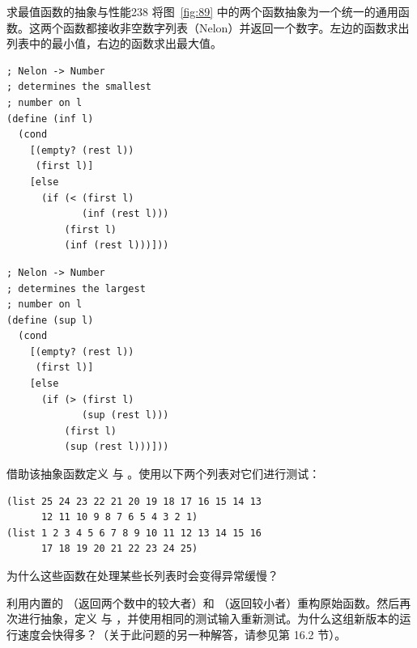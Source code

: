 \begin{exercise}{求最值函数的抽象与性能}{238}
将图~\ref{fig:89} 中的两个函数抽象为一个统一的通用函数。这两个函数都接收非空数字列表（Nelon）并返回一个数字。左边的函数求出列表中的最小值，右边的函数求出最大值。

\begin{center}
  \begin{stepperbox}[unbreakable]
    \noindent\begin{minipage}[t]{0.48\linewidth}\vspace{0pt}
\begin{Verbatim}[commandchars=\\\{\}, fontsize=\fontsize{6.0pt}{7.2pt}\selectfont]
; Nelon -> Number
; determines the smallest
; number on l
(define (inf l)
  (cond
    [(empty? (rest l))
     (first l)]
    [else
      (if (< (first l)
             (inf (rest l)))
          (first l)
          (inf (rest l)))]))
\end{Verbatim}
    \end{minipage}\hfill
    \begin{minipage}[t]{0.48\linewidth}\vspace{0pt}
\begin{Verbatim}[commandchars=\\\{\}, fontsize=\fontsize{6.0pt}{7.2pt}\selectfont]
; Nelon -> Number
; determines the largest
; number on l
(define (sup l)
  (cond
    [(empty? (rest l))
     (first l)]
    [else
      (if (> (first l)
             (sup (rest l)))
          (first l)
          (sup (rest l)))]))
\end{Verbatim}
    \end{minipage}
  \end{stepperbox}
  \label{fig:89}
\end{center}

借助该抽象函数定义  与 。使用以下两个列表对它们进行测试：

\begin{lstlisting}[language=BSL]
(list 25 24 23 22 21 20 19 18 17 16 15 14 13
      12 11 10 9 8 7 6 5 4 3 2 1)
(list 1 2 3 4 5 6 7 8 9 10 11 12 13 14 15 16
      17 18 19 20 21 22 23 24 25)
\end{lstlisting}

为什么这些函数在处理某些长列表时会变得异常缓慢？

利用内置的 （返回两个数中的较大者）和 （返回较小者）重构原始函数。然后再次进行抽象，定义  与 ，并使用相同的测试输入重新测试。为什么这组新版本的运行速度会快得多？（关于此问题的另一种解答，请参见第 16.2 节）。
\end{exercise}

